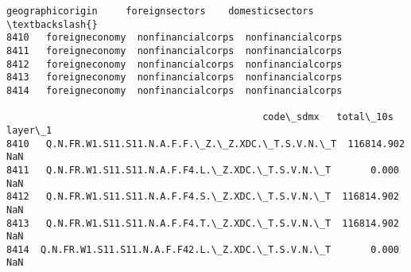 \documentclass[11pt]{article}
\begin{document}
    \begin{Verbatim}[commandchars=\\\{\}]
     geographicorigin     foreignsectors    domesticsectors  \textbackslash{}
8410   foreigneconomy  nonfinancialcorps  nonfinancialcorps
8411   foreigneconomy  nonfinancialcorps  nonfinancialcorps
8412   foreigneconomy  nonfinancialcorps  nonfinancialcorps
8413   foreigneconomy  nonfinancialcorps  nonfinancialcorps
8414   foreigneconomy  nonfinancialcorps  nonfinancialcorps

                                             code\_sdmx   total\_10s  layer\_1
8410   Q.N.FR.W1.S11.S11.N.A.F.F.\_Z.\_Z.XDC.\_T.S.V.N.\_T  116814.902      NaN
8411   Q.N.FR.W1.S11.S11.N.A.F.F4.L.\_Z.XDC.\_T.S.V.N.\_T       0.000      NaN
8412   Q.N.FR.W1.S11.S11.N.A.F.F4.S.\_Z.XDC.\_T.S.V.N.\_T  116814.902      NaN
8413   Q.N.FR.W1.S11.S11.N.A.F.F4.T.\_Z.XDC.\_T.S.V.N.\_T  116814.902      NaN
8414  Q.N.FR.W1.S11.S11.N.A.F.F42.L.\_Z.XDC.\_T.S.V.N.\_T       0.000      NaN
    \end{Verbatim}
\end{document}
